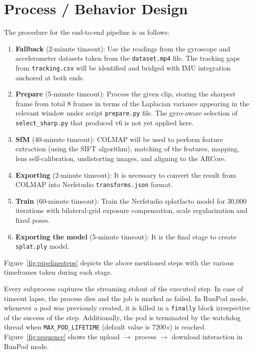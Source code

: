\section{Process / Behavior Design}
\label{sec:process}

The procedure for the end-to-end pipeline is as follows:

\begin{enumerate}
    \item \textbf{Fallback} (2-minute timeout): Use the readings from the gyroscope and accelerometer datasets taken from the \texttt{dataset.mp4} file. The tracking gaps from \texttt{tracking.csv} will be identified and bridged with IMU integration anchored at both ends.
    \item \textbf{Prepare} (5-minute timeout): Process the given clip, storing the sharpest frame from total 8 frames in terms of the Laplacian variance appearing in the relevant window under script \texttt{prepare.py} file. The gyro-aware selection of \texttt{select\_sharp.py} that produced v6 is not yet applied here.
    \item \textbf{SfM} (40-minute timeout): COLMAP will be used to perform feature extraction (using the SIFT algorithm), matching of the features, mapping, lens self-calibration, undistorting images, and aligning to the ARCore.
    \item \textbf{Exporting} (2-minute timeout): It is necessary to convert the result from COLMAP into Nerfstudio \texttt{transforms.json} format.
    \item \textbf{Train} (60-minute timeout): Train the Nerfstudio splatfacto model for 30,000 iterations with bilateral-grid exposure compensation, scale regularization and fixed poses.
    \item \textbf{Exporting the model} (5-minute timeout): It is the final stage to create \texttt{splat.ply} model.
\end{enumerate}

Figure~\ref{fig:pipelinesteps} depicts the above mentioned steps with the various timeframes taken during each stage.

Every subprocess captures the streaming stdout of the executed step. In case of timeout lapse, the process dies and the job is marked as failed. In RunPod mode, whenever a pod was previously created, it is killed in a \texttt{finally} block irrespective of the success of the step. Additionally, the pod is terminated by the watchdog thread when \texttt{MAX\_POD\_LIFETIME} (default value is 7200\,s) is reached. Figure~\ref{fig:sequence} shows the upload $\rightarrow$ process $\rightarrow$ download interaction in RunPod mode.

